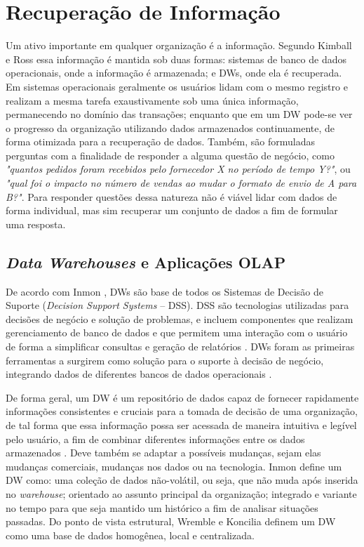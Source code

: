 \chapter{Recuperação de Informação}
\label{cap_2}

Um ativo importante em qualquer organização é a informação. Segundo Kimball e Ross \cite{kimball2002dw} essa informação é mantida sob duas formas: sistemas de banco de dados operacionais, onde a informação é armazenada; e DWs, onde ela é recuperada. Em sistemas operacionais geralmente os usuários lidam com o mesmo registro e realizam a mesma tarefa exaustivamente sob uma única informação, permanecendo no domínio das transações; enquanto que em um DW pode-se ver o progresso da organização utilizando dados armazenados continuamente, de forma otimizada para a recuperação de dados. Também, são formuladas perguntas com a finalidade de responder a alguma questão de negócio, como \textit{"quantos pedidos foram recebidos pelo fornecedor X no período de tempo Y?"}, ou \textit{"qual foi o impacto no número de vendas ao mudar o formato de envio de A para B?"}. Para responder questões dessa natureza não é viável lidar com dados de forma individual, mas sim recuperar um conjunto de dados a fim de formular uma resposta.


\section{\textit{Data Warehouses} e Aplicações OLAP}

De acordo com Inmon \cite{inmon2005building}, DWs são base de todos os Sistemas de Decisão de Suporte (\textit{Decision Support Systems} -- DSS). DSS são tecnologias utilizadas para decisões de negócio e solução de problemas, e incluem componentes que realizam gerenciamento de banco de dados e que permitem uma interação com o usuário de forma a simplificar consultas e geração de relatórios \cite{shim2002past}. DWs foram as primeiras ferramentas a surgirem como solução para o suporte à decisão de negócio, integrando dados de diferentes bancos de dados operacionais \cite{inmon2005building, kimball2002dw}.

De forma geral, um DW é um repositório de dados capaz de fornecer rapidamente informações consistentes e cruciais para a tomada de decisão de uma organização, de tal forma que essa informação possa ser acessada de maneira intuitiva e legível pelo usuário, a fim de combinar diferentes informações entre os dados armazenados \cite{kimball2002dw}. Deve também se adaptar a possíveis mudanças, sejam elas mudanças comerciais, mudanças nos dados ou na tecnologia. Inmon \cite{inmon2005building} define um DW como: uma coleção de dados não-volátil, ou seja, que não muda após inserida no \textit{warehouse}; orientado ao assunto principal da organização; integrado e variante no tempo para que seja mantido um histórico a fim de analisar situações passadas. Do ponto de vista estrutural, Wremble e Koncilia \cite{wrembel2007data} definem um DW como uma base de dados homogênea, local e centralizada.

